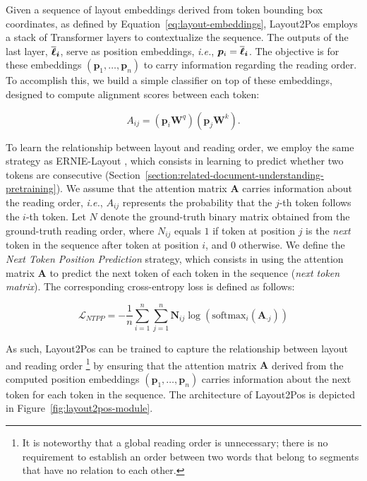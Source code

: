 Given a sequence of layout embeddings derived from token bounding box coordinates, as defined by Equation~\ref{eq:layout-embeddings}, Layout2Pos employs a stack of Transformer layers to contextualize the sequence. The outputs of the last layer, $\bm{\overline{\boldsymbol{\ell}}_i}$, serve as position embeddings, \textit{i.e.}, $\bm{p}_i = \bm{\overline{\boldsymbol{\ell}}_i}$. The objective is for these embeddings $(\bm{p}_1, \ldots, \bm{p}_n)$ to carry information regarding the reading order. To accomplish this, we build a simple classifier on top of these embeddings, designed to compute alignment scores between each token:

\begin{equation}
  A_{ij} = \left(\bm{p}_i \bm{W}^q\right)\left(\bm{p}_j \bm{W}^k\right).
\end{equation}

\noindent To learn the relationship between layout and reading order, we employ the same strategy as ERNIE-Layout \citep{peng2022ernie}, which consists in learning to predict whether two tokens are consecutive (Section~\ref{section:related-document-understanding-pretraining}). We assume that the attention matrix $\bm{A}$ carries information about the reading order, \textit{i.e.}, $A_{ij}$ represents the probability that the $j$-th token follows the $i$-th token. Let $N$ denote the ground-truth binary matrix obtained from the ground-truth reading order, where $N_{ij}$ equals $1$ if token at position $j$ is the \textit{next} token in the sequence after token at position $i$, and $0$ otherwise. We define the \textit{Next Token Position Prediction} strategy, which consists in using the attention matrix $\bm{A}$ to predict the next token of each token in the sequence (\textit{next token matrix}). The corresponding cross-entropy loss is defined as follows:

\begin{equation}
  \mathcal{L}_{NTPP} = - \dfrac{1}{n} \sum_{i=1}^n \sum_{j=1}^n \bm{N}_{ij} \log\left(\textrm{softmax}_i(\bm{A}_{\cdot j})\right)
\end{equation}

\noindent As such, Layout2Pos can be trained to capture the relationship between layout and reading order \footnote{It is noteworthy that a global reading order is unnecessary; there is no requirement to establish an order between two words that belong to segments that have no relation to each other.} by ensuring that the attention matrix $\bm{A}$ derived from the computed position embeddings $(\bm{p}_1, \ldots, \bm{p}_n)$ carries information about the next token for each token in the sequence. The architecture of Layout2Pos is depicted in Figure~\ref{fig:layout2pos-module}. 

